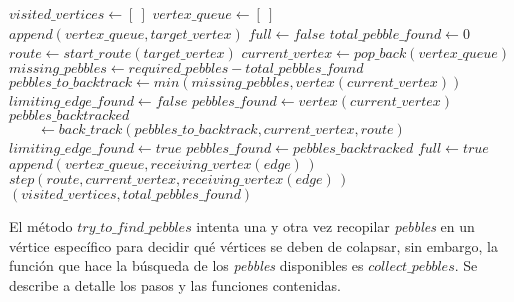 \begin{algorithm}
\begin{algorithmic}[1]
	\State $visited\_vertices \gets [\:]$
	\State $vertex\_queue \gets [\:]$
	\State $append(vertex\_queue, target\_vertex)$
	\State $full \gets false$
	\State $total\_pebble\_found \gets 0$
	\State $route \gets start\_route(target\_vertex)$
		\State $current\_vertex \gets pop\_back(vertex\_queue)$
		\State $missing\_pebbles \gets required\_pebbles - total\_pebbles\_found$
		\State $pebbles\_to\_backtrack \gets min(missing\_pebbles, vertex(current\_vertex))$
		\State $limiting\_edge\_found \gets false$
		\State $pebbles\_found \gets vertex(current\_vertex)$
			\State $pebbles\_backtracked$
			\State $\qquad \gets back\_track(pebbles\_to\_backtrack, current\_vertex, route)$
				\State $limiting\_edge\_found \gets true$
			\EndIf
		\State $pebbles\_found \gets pebbles\_backtracked$
		\EndIf
			\State $full \gets true$
		\Else
						\State $append(vertex\_queue, receiving\_vertex(edge)\,)$
						\State $step(route, current\_vertex, receiving\_vertex(edge)\,)$
					\EndIf
				\EndFor
			\EndIf
		\EndIf
	\EndWhile
	\State
	\Return $(visited\_vertices, total\_pebbles\_found)$
\EndFunction
\end{algorithmic}
\end{algorithm}

El método $try\_to\_find\_pebbles$ intenta una y otra vez recopilar \emph{pebbles} en un vértice específico para decidir qué vértices se deben de colapsar, sin embargo, la función que hace la búsqueda de los \emph{pebbles} disponibles es $collect\_pebbles$. Se describe a detalle los pasos y las funciones contenidas.

